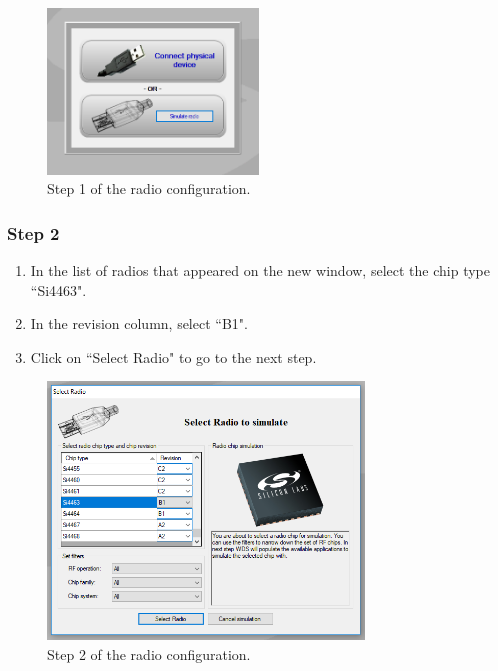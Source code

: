 \begin{figure}[!h]
	\begin{center}
		\includegraphics[width=0.5\textwidth]{figures/wds-tutorial/wds-tutorial-1.png}
		\caption{Step 1 of the radio configuration.}
		\label{fig:wds-tutorial-step-1}
	\end{center}
\end{figure}

\subsubsection{Step 2}

\begin{enumerate}
    \item In the list of radios that appeared on the new window, select the chip type ``Si4463".
    \item In the revision column, select ``B1".
    \item Click on ``Select Radio" to go to the next step.
\end{enumerate}

\begin{figure}[!h]
	\begin{center}
		\includegraphics[width=0.75\textwidth]{figures/wds-tutorial/wds-tutorial-2.png}
		\caption{Step 2 of the radio configuration.}
		\label{fig:wds-tutorial-step-2}
	\end{center}
\end{figure}

